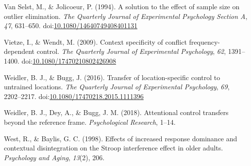 \documentclass[english,,man,floatsintext]{apa6}
\begin{document}
\hypertarget{ref-van_selst_solution_1994}{}
Van Selst, M., \& Jolicoeur, P. (1994). A solution to the effect of
sample size on outlier elimination. \emph{The Quarterly Journal of
Experimental Psychology Section A}, \emph{47}, 631--650.
doi:\href{https://doi.org/10.1080/14640749408401131}{10.1080/14640749408401131}

\hypertarget{ref-vietze_context_2009}{}
Vietze, I., \& Wendt, M. (2009). Context specificity of conflict
frequency-dependent control. \emph{The Quarterly Journal of Experimental
Psychology}, \emph{62}, 1391--1400.
doi:\href{https://doi.org/10.1080/17470210802426908}{10.1080/17470210802426908}

\hypertarget{ref-weidler_transfer_2016}{}
Weidler, B. J., \& Bugg, J. (2016). Transfer of location-specific
control to untrained locations. \emph{The Quarterly Journal of
Experimental Psychology}, \emph{69}, 2202--2217.
doi:\href{https://doi.org/10.1080/17470218.2015.1111396}{10.1080/17470218.2015.1111396}

\hypertarget{ref-weidler_attentional_2018}{}
Weidler, B. J., Dey, A., \& Bugg, J. M. (2018). Attentional control
transfers beyond the reference frame. \emph{Psychological Research},
1--14.

\hypertarget{ref-west_effects_1998}{}
West, R., \& Baylis, G. C. (1998). Effects of increased response
dominance and contextual disintegration on the Stroop interference
effect in older adults. \emph{Psychology and Aging}, \emph{13}(2), 206.

\endgroup
\end{document}
